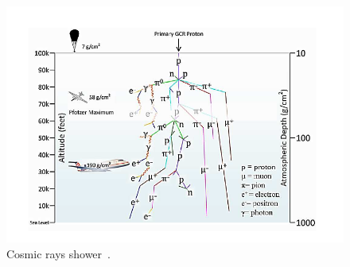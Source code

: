 \begin{figure}[h]
 \centering
  \captionsetup{justification=centering}    
   \includegraphics[scale=0.5]{Figures/showerplusaircraft.png}
  \caption{Cosmic rays shower~\cite{ziegler1996ibm}.}
\label{shower}
\end{figure}


